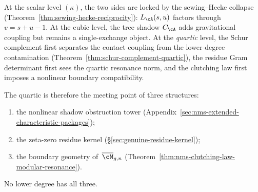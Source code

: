 \begin{remark}%
\label{rem:quartic-meeting-point}%
%
At the scalar level $(\kappa)$, the two sides are locked by
the sewing--Hecke collapse
(Theorem~\ref{thm:sewing-hecke-reciprocity}):
$L_\cA(s,u)$ factors through $v = s{+}u{-}1$.
At the cubic level, the tree shadow $C_\cA$ adds
gravitational coupling but remains a single-exchange object.
At the \emph{quartic} level, the Schur complement first
separates the contact coupling from the lower-degree
contamination
(Theorem~\ref{thm:schur-complement-quartic}),
the residue Gram determinant first sees the quartic
resonance norm, and the clutching law first imposes a
nonlinear boundary compatibility.

The quartic is therefore the meeting point of three
structures:
\begin{enumerate}[label=\textup{(\roman*)}]
\item
the nonlinear shadow obstruction tower
(Appendix~\ref{sec:nms-extended-characteristic-packages});
\item
the zeta-zero residue kernel
(\S\ref{sec:genuine-residue-kernel});
\item
the boundary geometry of~$\overline{\cM}_{g,n}$
(Theorem~\ref{thm:nms-clutching-law-modular-resonance}).
\end{enumerate}
No lower degree has all three.
\end{remark}

